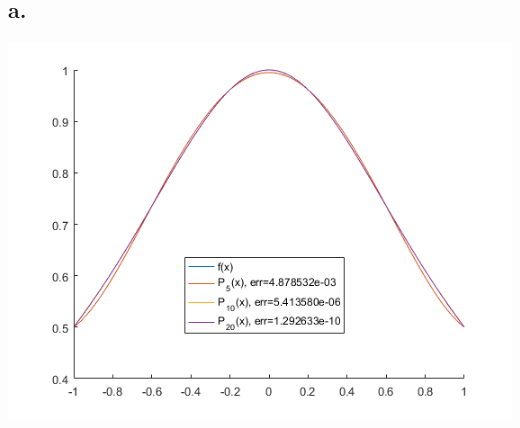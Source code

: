 \documentclass{article}
\begin{document}
\subsection*{a.}
\begin{center}
  \includegraphics[width=0.8\linewidth]{figures/question4-1}
\end{center}
\end{document}

